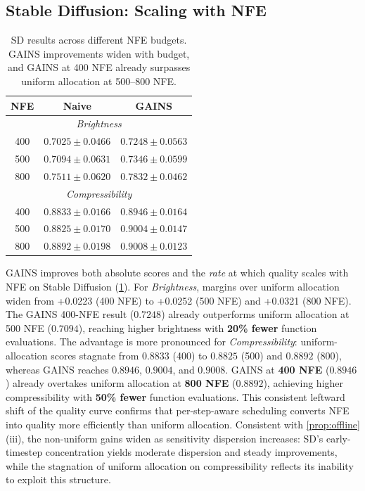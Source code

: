 \subsection{Stable Diffusion: Scaling with NFE}
\label{sec:exp-sd-scaling}
\begin{table}[t]
\centering
\caption{SD results across different NFE budgets.
GAINS improvements widen with budget, and GAINS at 400 NFE already surpasses uniform allocation at 500--800 NFE.}
\label{tab:sd_budget}
\begin{tabular}{c|c|c}
\toprule
\textbf{NFE} & \textbf{Naive} & \textbf{GAINS} \\
\midrule
\multicolumn{3}{c}{\textit{Brightness}} \\
\midrule
400 & $0.7025 \pm 0.0466$ & $0.7248 \pm 0.0563$ \\
500 & $0.7094 \pm 0.0631$ & $0.7346 \pm 0.0599$ \\
800 & $0.7511 \pm 0.0620$ & $0.7832 \pm 0.0462$ \\
\midrule
\multicolumn{3}{c}{\textit{Compressibility}} \\
\midrule
400 & $0.8833 \pm 0.0166$ & $0.8946 \pm 0.0164$ \\
500 & $0.8825 \pm 0.0170$ & $0.9004 \pm 0.0147$ \\
800 & $0.8892 \pm 0.0198$ & $0.9008 \pm 0.0123$ \\
\bottomrule
\end{tabular}
\end{table}

GAINS improves both absolute scores and the \emph{rate} at which quality scales with NFE on Stable Diffusion (\cref{tab:sd_budget}).
For \textit{Brightness}, margins over uniform allocation widen from +0.0223 (400 NFE)
to +0.0252 (500 NFE) and +0.0321 (800 NFE).
The GAINS 400-NFE result ($0.7248$) already outperforms uniform allocation at
500 NFE ($0.7094$), reaching higher brightness with
\textbf{20\% fewer} function evaluations.
The advantage is more pronounced for \textit{Compressibility}:
uniform-allocation scores stagnate from $0.8833$ (400) to $0.8825$ (500) and $0.8892$ (800),
whereas GAINS reaches $0.8946$, $0.9004$, and $0.9008$.
GAINS at \textbf{400 NFE} ($0.8946$) already overtakes uniform allocation
at \textbf{800 NFE} ($0.8892$), achieving higher compressibility with \textbf{50\% fewer} function evaluations.
This consistent leftward shift of the quality curve confirms that
per-step-aware scheduling converts NFE into quality more efficiently than uniform allocation.
Consistent with \cref{prop:offline}(iii), the non-uniform gains widen as sensitivity dispersion increases: SD's early-timestep concentration yields moderate dispersion and steady improvements, while the stagnation of uniform allocation on compressibility reflects its inability to exploit this structure.

